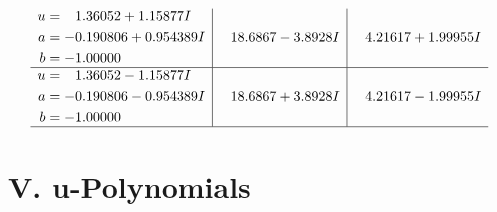 \documentclass[1p]{elsarticle_modified}
\theoremstyle{definition}
\begin{document}
$$\begin{array}{c|c|c}
\begin{aligned}
u &= \phantom{-}1.36052 + 1.15877 I \\
a &= -0.190806 + 0.954389 I \\
b &= -1.00000\phantom{ +0.000000I}\end{aligned}
 & \phantom{-}18.6867 - 3.8928 I & \phantom{-}4.21617 + 1.99955 I \\ \hline\begin{aligned}
u &= \phantom{-}1.36052 - 1.15877 I \\
a &= -0.190806 - 0.954389 I \\
b &= -1.00000\phantom{ +0.000000I}\end{aligned}
 & \phantom{-}18.6867 + 3.8928 I & \phantom{-}4.21617 - 1.99955 I\\
 \hline 
 \end{array}$$\newpage
\newpage\renewcommand{\arraystretch}{1}
\centering \section*{ V. u-Polynomials}
\end{document}
